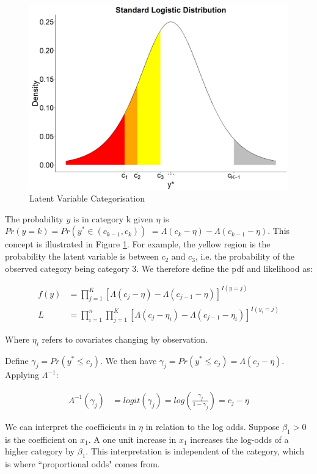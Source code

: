 \documentclass[11pt,twoside]{article}
\numberwithin{Theorem}{section}
\numberwithin{Definition}{section}
\numberwithin{Lemma}{section}
\numberwithin{Algorithm}{section}
\numberwithin{equation}{section}
\begin{document}
\begin{figure}[h]
	\centering
	\includegraphics[height = 0.3\textheight]{Figures/0_Logit.png}
	\caption{Latent Variable Categorisation} \label{fig::0_Logit}
\end{figure}


The probability $y$ is in category k given $\eta$ is $Pr(y = k) = Pr(y^* \in (c_{k-1}, c_{k}))$ $= \Lambda(c_k- \eta) - \Lambda(c_{k-1} - \eta)$. This concept is illustrated in Figure \ref{fig::0_Logit}. For example, the yellow region is the probability the latent variable is between $c_2$ and $c_3$, i.e. the probability of the observed category being category 3. We therefore define the pdf and likelihood as:

\begin{align}
f(y) &= \prod_{j = 1}^{K}[\Lambda(c_j - \eta) - \Lambda(c_{j-1} - \eta)]^{I(y=j)}  \\
L &= \prod_{i=1}^{n} \prod_{j = 1}^{K}[\Lambda(c_j - \eta_i) - \Lambda(c_{j-1} - \eta_i)]^{I(y_i=j)} 
\end{align}

Where $\eta_i$ refers to covariates changing by observation. 

Define $\gamma_j = Pr(y^* \le c_j)$. We then have $\gamma_j = Pr(y^* \le c_j) = \Lambda(c_j - \eta)$.  Applying $\Lambda^{-1}$:

\begin{align}
	\Lambda^{-1}(\gamma_j) &= logit(\gamma_j) = log\left(\frac{\gamma_j}{1 - \gamma_j}\right) = c_j - \eta \label{eq::logitlink}
\end{align}

We can interpret the coefficients in $\eta$ in relation to the log odds. Suppose $\beta_1 > 0$ is the coefficient on $x_1$. A one unit increase in $x_1$ increases the log-odds of a higher category by $\beta_1$. This interpretation is independent of the category, which is where ``proportional odds" comes from. 
\end{document}
